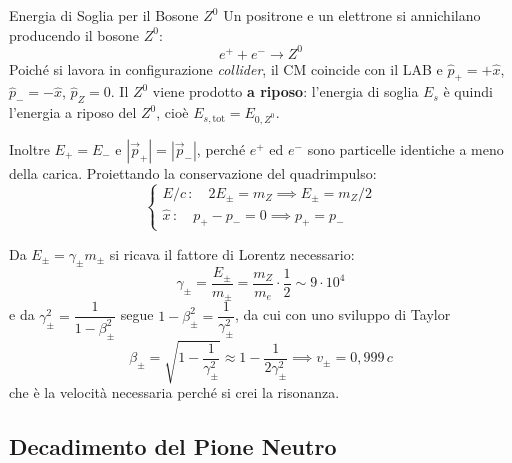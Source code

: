 \begin{esempio}{Energia di Soglia per il Bosone $Z^0$}
Un positrone e un elettrone si annichilano producendo il bosone $Z^0$:
\begin{equation}
    e^+ + e^- \longrightarrow Z^0
\end{equation}
Poiché si lavora in configurazione \emph{collider}, il CM coincide con il LAB e $\hat{p}_+ = +\hat{x}$, $\hat{p}_- = -\hat{x}$, $\hat{p}_Z = 0$. Il $Z^0$ viene prodotto \textbf{a riposo}: l'energia di soglia $E_s$ è quindi l'energia a riposo del $Z^0$, cioè $E_{s,\text{tot}} = E_{0,Z^0}$.

Inoltre $E_+ = E_-$ e $|\vec{p}_+| = |\vec{p}_-|$, perché $e^+$ ed $e^-$ sono particelle identiche a meno della carica. Proiettando la conservazione del quadrimpulso:
\begin{equation*}
    \begin{cases}
        E/c \, : \quad 2E_{\pm} = m_Z \implies E_{\pm} = m_Z/2 \\
        \hat{x} \, : \quad p_+ - p_- = 0 \implies p_+ = p_-
    \end{cases}
\end{equation*}

Da $E_{\pm} = \gamma_{\pm}m_{\pm}$ si ricava il fattore di Lorentz necessario:
\begin{equation*}
    \gamma_{\pm} = \frac{E_{\pm}}{m_{\pm}} = \frac{m_Z}{m_e}\cdot\frac{1}{2} \sim 9 \cdot 10^4
\end{equation*}
e da $\gamma_{\pm}^2 = \dfrac{1}{1-\beta_{\pm}^2}$ segue $1 - \beta_{\pm}^2 = \dfrac{1}{\gamma_{\pm}^2}$, da cui con uno sviluppo di Taylor
\begin{equation*}
    \beta_{\pm} = \sqrt{1 - \frac{1}{\gamma_{\pm}^2}} \approx 1 - \frac{1}{2\gamma_{\pm}^2}
    \implies v_{\pm} = 0{,}999\,c
\end{equation*}
che è la velocità necessaria perché si crei la risonanza.
\end{esempio}

\subsection{Decadimento del Pione Neutro}

